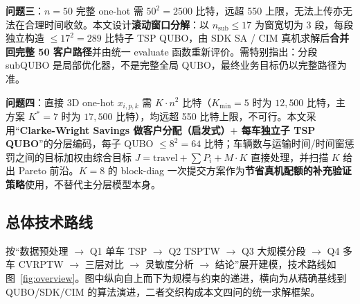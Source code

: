 \documentclass[UTF8,12pt,a4paper]{ctexart}
\begin{document}
\textbf{问题三}：$n=50$ 完整 one-hot 需 $50^{2}=2500$ 比特，远超 550 上限，无法上传亦无法在合理时间收敛。本文设计\textbf{滚动窗口分解}：以 $n_{\text{sub}}\!\le\!17$ 为窗宽切为 3 段，每段独立构造 $\le 17^{2}=289$ 比特子 TSP QUBO，由 SDK SA / CIM 真机求解后\textbf{合并回完整 50 客户路径}并由统一 evaluate 函数重新评价。需特别指出：分段 subQUBO 是局部优化器，不是完整全局 QUBO，最终业务目标仍以完整路径为准。

\textbf{问题四}：直接 3D one-hot $x_{i,p,k}$ 需 $K\!\cdot\!n^{2}$ 比特（$K_{\min}\!=\!5$ 时为 $12{,}500$ 比特，主方案 $K^{*}\!=\!7$ 时为 $17{,}500$ 比特），均远超 550 比特上限，不可行。本文采用``\textbf{Clarke-Wright Savings 做客户分配（启发式）$+$ 每车独立子 TSP QUBO}''的分层编码，每子 QUBO $\le 8^{2}=64$ 比特；车辆数与运输时间/时间窗惩罚之间的目标加权由综合目标 $J=\text{travel}+\sum P_i+M\!\cdot\!K$ 直接处理，并扫描 $K$ 给出 Pareto 前沿。$K=8$ 的 block-diag 一次提交方案作为\textbf{节省真机配额的补充验证策略}使用，不替代主分层模型本身。

\subsection{总体技术路线}

按``数据预处理 $\rightarrow$ Q1 单车 TSP $\rightarrow$ Q2 TSPTW $\rightarrow$ Q3 大规模分段 $\rightarrow$ Q4 多车 CVRPTW $\rightarrow$ 三层对比 $\rightarrow$ 灵敏度分析 $\rightarrow$ 结论''展开建模，技术路线如图~\ref{fig:overview}。图中纵向自上而下为规模与约束的递进，横向为从精确基线到 QUBO/SDK/CIM 的算法演进，二者交织构成本文四问的统一求解框架。
\end{document}
